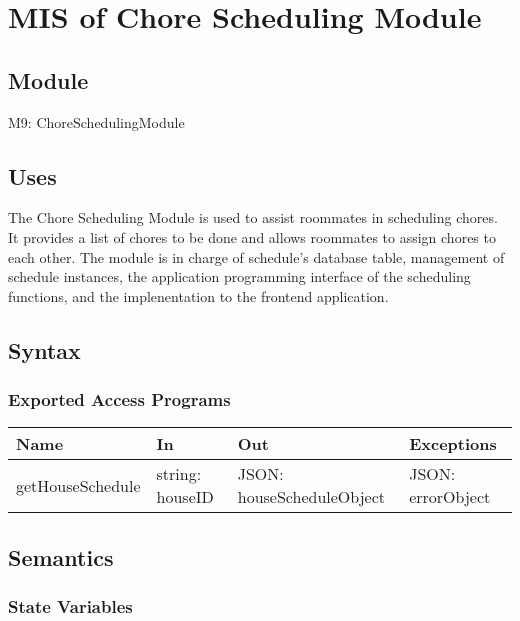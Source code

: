 \documentclass[12pt, titlepage]{article}
\begin{document}
\newpage


\section{MIS of Chore Scheduling Module} \label{Module} 

\subsection{Module}

M9: ChoreSchedulingModule

\subsection{Uses}
The Chore Scheduling Module is used to assist roommates in scheduling chores. It provides a list of chores to be done and allows roommates to assign chores to each other. The module is in charge of schedule's database table, management of schedule instances, the application programming interface of the scheduling functions, and the implenentation to the frontend application. 

\subsection{Syntax}

\subsubsection{Exported Access Programs}

\begin{center}
\begin{tabular}{p{4cm} p{3cm} p{5cm} p{3.5cm}}
\hline
\textbf{Name} & \textbf{In} & \textbf{Out} & \textbf{Exceptions} \\
\hline
getHouseSchedule & string: houseID & JSON: houseScheduleObject & JSON: errorObject \\
\hline
\end{tabular}
\end{center}

\subsection{Semantics}

\subsubsection{State Variables}
\end{document}
